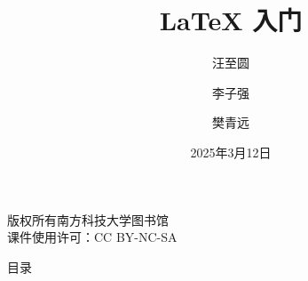 \documentclass{libs/SUSTech_format}
\title[\LaTeX{} 入门]{\huge \textbf{\LaTeX{} 入门}}
\author[CRA 计算机研究协会]{汪至圆\and 李子强  \and 樊青远}
\institute[SUSTech]{
    \normalsize
    南方科技大学
}
\date{2025年3月12日}
\begin{document}



{

	\begin{frame}
		\begin{titlepage}
            \vfill %
            \hfill %
            \vspace{-2.8em}
            {
                \begin{minipage}{0.25\textwidth}
                    \raggedright\tiny
                    版权所有\textcopyright 南方科技大学图书馆 \\
                    课件使用许可：CC BY-NC-SA
                \end{minipage}
            }
        \end{titlepage}
	\end{frame}
}

\begin{frame}{目录}
	\begin{multicols}{2}
		\tableofcontents
	\end{multicols}
\end{frame}
\end{document}
